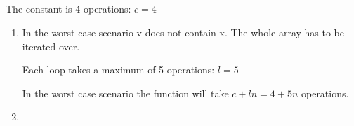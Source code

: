 \documentclass[12pt]{article}
\begin{document}
\subsection{} %
The constant is 4 operations: $c = 4$

\begin{enumerate}[a]
	\item %
	In the worst case scenario v does not contain x. The whole array has to be iterated over.

	Each loop takes a maximum of 5 operations: $l = 5$

	In the worst case scenario the function will take $c + ln = 4 + 5n$ operations.

	\item %
\end{enumerate}

\subsection{} %

\subsection{} %

\subsection{} %
\end{document}
